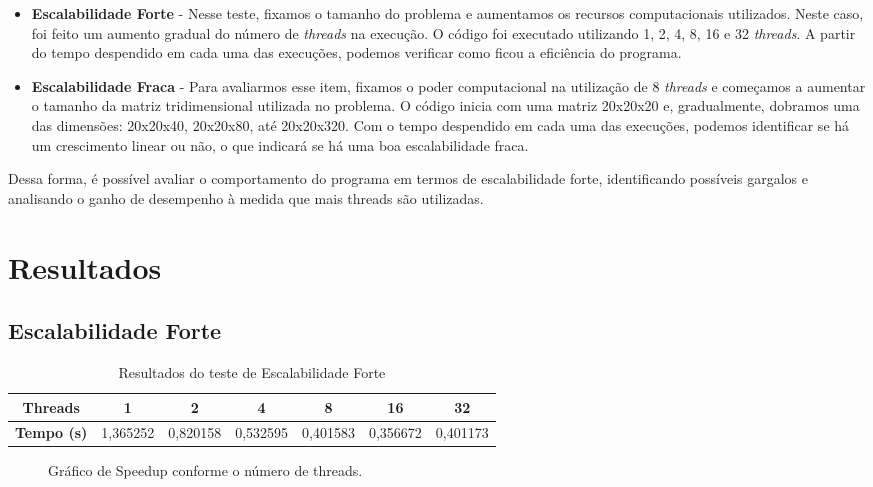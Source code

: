 \documentclass[a4paper, 12pt]{article}
\begin{document}
	\begin{itemize}
		\item \textbf{Escalabilidade Forte} - Nesse teste, fixamos o tamanho do problema e aumentamos os recursos computacionais utilizados. Neste caso, foi feito um aumento gradual do número de \textit{threads} na execução. O código foi executado utilizando 1, 2, 4, 8, 16 e 32 \textit{threads}. A partir do tempo despendido em cada uma das execuções, podemos verificar como ficou a eficiência do programa.
		
		\item \textbf{Escalabilidade Fraca} - Para avaliarmos esse item, fixamos o poder computacional na utilização de 8 \textit{threads} e começamos a aumentar o tamanho da matriz tridimensional utilizada no problema. O código inicia com uma matriz 20x20x20 e, gradualmente, dobramos uma das dimensões: 20x20x40, 20x20x80, até 20x20x320. Com o tempo despendido em cada uma das execuções, podemos identificar se há um crescimento linear ou não, o que indicará se há uma boa escalabilidade fraca.
	\end{itemize}
	
	 Dessa forma, é possível avaliar o comportamento do programa em termos de escalabilidade forte, identificando possíveis gargalos e analisando o ganho de desempenho à medida que mais threads são utilizadas.
	 
	 \section{Resultados}
	 \subsection{Escalabilidade Forte}
	 \begin{table}[H]
	 	\centering
	 	\begin{tabular}{|c|c|c|c|c|c|c|}
	 		\hline
	 		\textbf{Threads} & 1 & 2 & 4 & 8 & 16 & 32 \\ \hline
	 		\textbf{Tempo (s)} & 1,365252 & 0,820158 & 0,532595 & 0,401583 & 0,356672 & 0,401173 \\ \hline
	 	\end{tabular}
	 	\caption{Resultados do teste de Escalabilidade Forte}
	 \end{table}
	 
	 \begin{figure}[H]
	 	\centering
	 	\caption{Gráfico de Speedup conforme o número de threads.}
	 \end{figure}
	 
\end{document}
